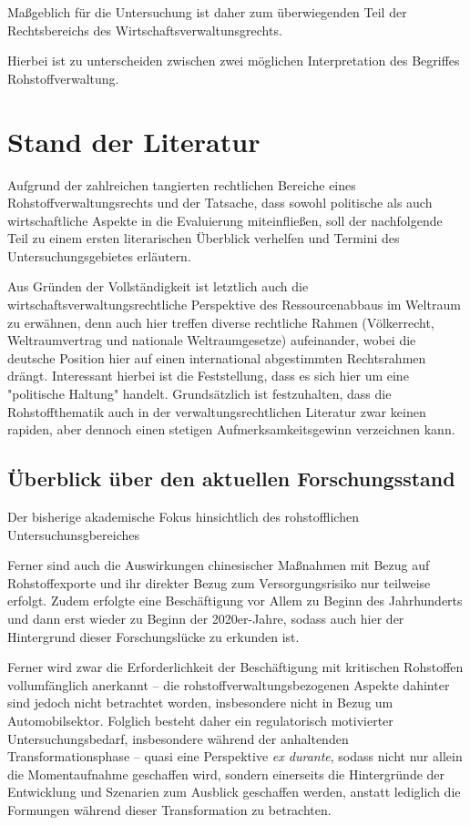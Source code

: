 \documentclass[12pt,a4paper,oneside]{book} %
\begin{document}
Maßgeblich für die Untersuchung ist daher zum überwiegenden Teil der Rechtsbereichs des Wirtschaftsverwaltunsgrechts.

Hierbei ist zu unterscheiden zwischen zwei möglichen Interpretation des Begriffes Rohstoffverwaltung.


\section{Stand der Literatur}
Aufgrund der zahlreichen tangierten rechtlichen Bereiche eines Rohstoffverwaltungsrechts und der Tatsache, dass sowohl politische als auch wirtschaftliche Aspekte in die Evaluierung miteinfließen, soll der nachfolgende Teil zu einem ersten literarischen Überblick verhelfen und Termini des Untersuchungsgebietes erläutern.


Aus Gründen der Vollständigkeit ist letztlich auch die wirtschaftsverwaltungsrechtliche Perspektive des Ressourcenabbaus im Weltraum zu erwähnen, denn auch hier treffen diverse rechtliche Rahmen (Völkerrecht, Weltraumvertrag und nationale Weltraumgesetze) aufeinander, wobei die deutsche Position hier auf einen international abgestimmten Rechtsrahmen drängt. Interessant hierbei ist die Feststellung, dass es sich hier um eine "politische Haltung" handelt.
Grundsätzlich ist festzuhalten, dass die Rohstoffthematik auch in der verwaltungsrechtlichen Literatur zwar keinen rapiden, aber dennoch einen stetigen Aufmerksamkeitsgewinn verzeichnen kann.

\subsection{Überblick über den aktuellen Forschungsstand}

Der bisherige akademische Fokus hinsichtlich des rohstofflichen Untersuchunsgbereiches 

Ferner sind auch die Auswirkungen chinesischer Maßnahmen mit Bezug auf Rohstoffexporte und ihr direkter Bezug zum Versorgungsrisiko nur teilweise erfolgt. Zudem erfolgte eine Beschäftigung vor Allem zu Beginn des Jahrhunderts und dann erst wieder zu Beginn der 2020er-Jahre, sodass auch hier der Hintergrund dieser Forschungslücke zu erkunden ist.

Ferner wird zwar die Erforderlichkeit der Beschäftigung mit kritischen Rohstoffen vollumfänglich anerkannt -- die rohstoffverwaltungsbezogenen Aspekte dahinter sind jedoch nicht betrachtet worden, insbesondere nicht in Bezug um Automobilsektor. Folglich besteht daher ein regulatorisch motivierter Untersuchungsbedarf, insbesondere während der anhaltenden Transformationsphase -- quasi eine Perspektive \textit{ex durante}, sodass nicht nur allein die Momentaufnahme geschaffen wird, sondern einerseits die Hintergründe der Entwicklung und Szenarien zum Ausblick geschaffen werden, anstatt lediglich die Formungen während dieser Transformation zu betrachten.
\end{document}
